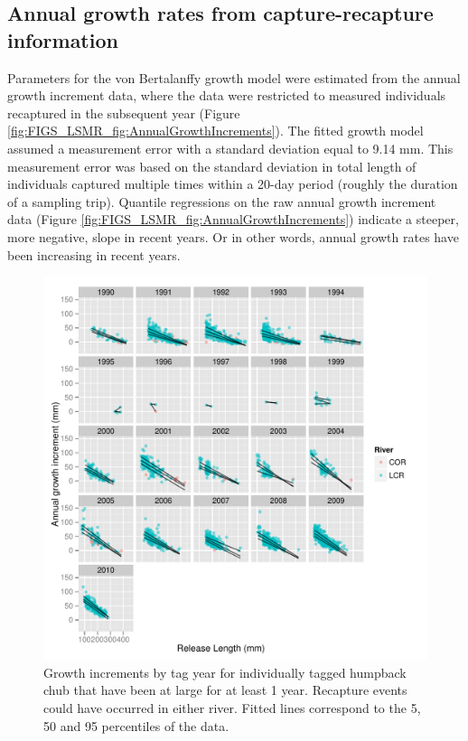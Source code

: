 

\subsection{Annual growth rates from capture-recapture information} %
\label{sub:annual_growth_rates_from_capture_recapture_information}

Parameters for the von Bertalanffy growth model were estimated from the annual growth increment data, where the data were restricted to measured individuals recaptured in the subsequent year (Figure \ref{fig:FIGS_LSMR_fig:AnnualGrowthIncrements}).  The fitted growth model assumed a measurement error with a standard deviation equal to 9.14 mm.  This measurement error was based on the standard deviation in total length of individuals captured multiple times within a 20-day period (roughly the duration of a sampling trip).  Quantile regressions on the raw annual growth increment data (Figure \ref{fig:FIGS_LSMR_fig:AnnualGrowthIncrements}) indicate a steeper, more negative, slope in recent years.  Or in other words, annual growth rates have been increasing in recent years.



\begin{figure}[htbp]
	\centering
		\includegraphics[width=6.5in]{../FIGS/LSMR/fig:GrowthIncrements.pdf}
	\caption{Growth increments by tag year for individually tagged humpback chub that have been at large for at least 1 year.   Recapture events could have occurred in either river. Fitted lines correspond to the 5, 50 and 95 percentiles of the data.}
	\label{fig:FIGS_LSMR_fig:GrowthIncrements}
\end{figure}

